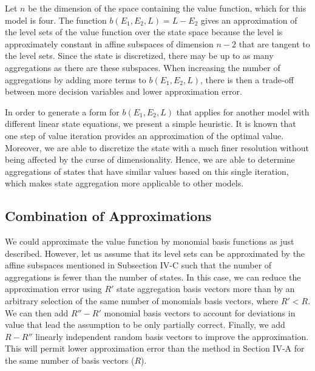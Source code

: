 \documentclass[conference]{IEEEtran}
\begin{document}
	Let $n$ be the dimension of the space containing the value function, which for this model is four. The function $b(E_{1},E_{2},L)=L-E_{2}$ gives an approximation of the level sets of the value function over the state space because the level is approximately constant in affine subspaces of dimension $n-2$ that are tangent to the level sets. Since the state is discretized, there may be up to as many aggregations as there are these subspaces. When increasing the number of aggregations by adding more terms to $b(E_{1},E_{2},L)$, there is then a trade-off between more decision variables and lower approximation error. %
	
	In order to generate a form for $b(E_{1},E_{2},L)$ that applies for another model with different linear state equations, we present a simple heuristic. It is known that one step of value iteration provides an approximation of the optimal value. Moreover, we are able to discretize the state with a much finer resolution without being affected by the curse of dimensionality. Hence, we are able to determine aggregations of states that have similar values based on this single iteration, which makes state aggregation more applicable to other models.
    

\subsection{Combination of Approximations}
    
    We could approximate the value function by monomial basis functions as just described. However, let us assume that its level sets can be approximated by the affine subspaces mentioned in Subsection IV-C such that the number of aggregations is fewer than the number of states. In this case, we can reduce the approximation error using $R'$ state aggregation basis vectors more than by an arbitrary selection of the same number of monomials basis vectors, where $R'<R$. We can then add $R''-R'$ monomial basis vectors to account for deviations in value that lead the assumption to be only partially correct. Finally, we add $R-R''$ linearly independent random basis vectors to improve the approximation. This will permit lower approximation error than the method in Section IV-A for the same number of basis vectors ($R$).
    
    
\end{document}
